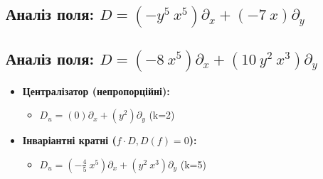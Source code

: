 \subsection*{Аналіз поля: $ D = ( - y^{5} ~ x^{5})\partial_x + ( - 7 ~ x)\partial_y $}
\begin{itemize}[leftmargin=1cm]
\end{itemize}
\hrulefill
\subsection*{Аналіз поля: $ D = ( - 8 ~ x^{5})\partial_x + (10 ~ y^{2} ~ x^{3})\partial_y $}
\begin{itemize}[leftmargin=1cm]
  \item \textbf{Централізатор (непропорційні):}
    \begin{itemize}
      \item $ D_u = (0)\partial_x + (y^{2})\partial_y $ (k=2)
    \end{itemize}
  \item \textbf{Інваріантні кратні ($f \cdot D, D(f)=0$):}
    \begin{itemize}
      \item $ D_u = ( - \frac{4}{5} ~ x^{5})\partial_x + (y^{2} ~ x^{3})\partial_y $ (k=5)
    \end{itemize}
\end{itemize}
\hrulefill
